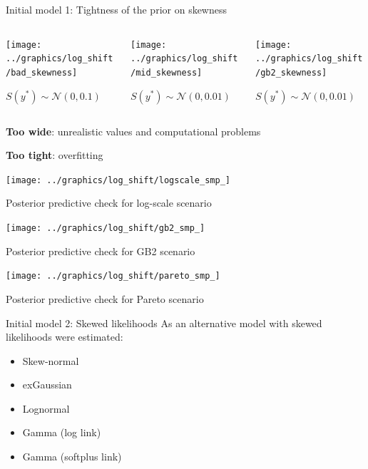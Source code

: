 \begin{frame}{Initial model 1: Tightness of the prior on skewness}

    \begin{columns}
        \begin{column}{0.32\textwidth}
            \texttt{[image: ../graphics/log\_shift/bad\_skewness]}

            $S(y^*) \sim \mathcal N (0, 0.1)$
        \end{column}



        \begin{column}{0.32\textwidth}
            \texttt{[image: ../graphics/log\_shift/mid\_skewness]}

            $S(y^*) \sim \mathcal N (0, 0.01)$
        \end{column}


        \begin{column}{0.32\textwidth}
            \texttt{[image: ../graphics/log\_shift/gb2\_skewness]}

            $S(y^*) \sim \mathcal N (0, 0.01)$
        \end{column}

    \end{columns}
    \vspace{1cm}
    \textbf{Too wide}: unrealistic values and computational problems
    \vspace{0.5cm}

    \textbf{Too tight}: overfitting
\end{frame}

\begin{frame}
    \vspace{-0.5cm}
    \centering
    \texttt{[image: ../graphics/log\_shift/logscale\_smp\_]}

    \scriptsize{Posterior predictive check for log-scale scenario}

    \texttt{[image: ../graphics/log\_shift/gb2\_smp\_]}

    \scriptsize{Posterior predictive check for GB2 scenario}

    \texttt{[image: ../graphics/log\_shift/pareto\_smp\_]}

    \scriptsize{Posterior predictive check for Pareto scenario}

\end{frame}

\begin{frame}{Initial model 2: Skewed likelihoods}
    As an alternative model with skewed likelihoods were estimated:
    \begin{itemize}
        \item Skew-normal
        \item exGaussian
        \item Lognormal
        \item Gamma (log link)
        \item Gamma (softplus link)
    \end{itemize}
\end{frame}

